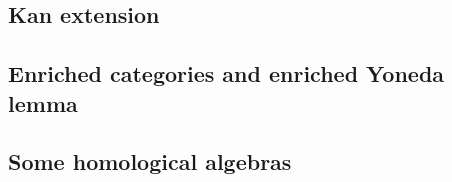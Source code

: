 \subsection{Kan extension}
    
\subsection{Enriched categories and enriched Yoneda lemma}
    
\subsection{Some homological algebras}
    
